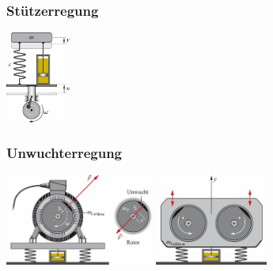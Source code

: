 \begin{center}
	\begin{minipage}{0.16\textwidth}
		\subsubsection{Stützerregung}
		\includegraphics[height=3cm,keepaspectratio=true]{Images/stuezerregung.png}
	\end{minipage}%
	\begin{minipage}{0.4\textwidth}
		\subsubsection{Unwuchterregung}
		\includegraphics[height=3cm,keepaspectratio=true]{Images/unwuchterregung.png}
		\includegraphics[height=3cm,keepaspectratio=true]{Images/unwuchterregung_doppelt.png}
	\end{minipage}
\end{center}









